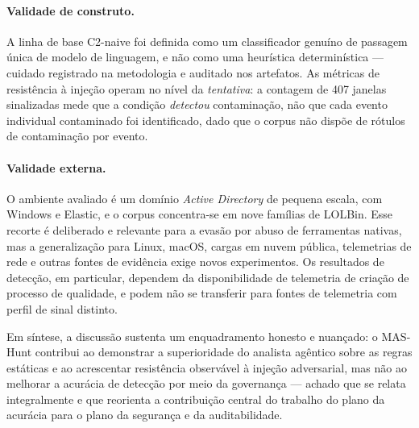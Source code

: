 \paragraph{Validade de construto.} A linha de base C2-naive foi definida como um
classificador genuíno de passagem única de modelo de linguagem, e não como uma
heurística determinística --- cuidado registrado na metodologia e auditado nos
artefatos. As métricas de resistência à injeção operam no nível da
\emph{tentativa}: a contagem de 407 janelas sinalizadas mede que a condição
\emph{detectou} contaminação, não que cada evento individual contaminado foi
identificado, dado que o corpus não dispõe de rótulos de contaminação por evento.

\paragraph{Validade externa.} O ambiente avaliado é um domínio \textit{Active
Directory} de pequena escala, com Windows e Elastic, e o corpus concentra-se em
nove famílias de LOLBin. Esse recorte é deliberado e relevante para a evasão por
abuso de ferramentas nativas, mas a generalização para Linux, macOS, cargas em
nuvem pública, telemetrias de rede e outras fontes de evidência exige novos
experimentos. Os resultados de detecção, em particular, dependem da disponibilidade
de telemetria de criação de processo de qualidade, e podem não se transferir para
fontes de telemetria com perfil de sinal distinto.

\bigskip
\noindent
Em síntese, a discussão sustenta um enquadramento honesto e nuançado: o MAS-Hunt
contribui ao demonstrar a superioridade do analista agêntico sobre as regras
estáticas e ao acrescentar resistência observável à injeção adversarial, mas não
ao melhorar a acurácia de detecção por meio da governança --- achado que se relata
integralmente e que reorienta a contribuição central do trabalho do plano da
acurácia para o plano da segurança e da auditabilidade.
